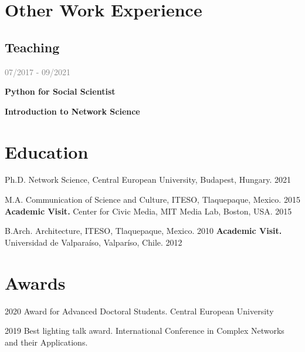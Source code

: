 \documentclass{academiccv}
\begin{document}
\section*{Other Work Experience}
\subsection*{Teaching}
\textcolor{gray}{{\small 07/2017 - 09/2021}}\\
\begin{list}{}{}
  \item{\textbf{Python for Social Scientist}}
  \item{\textbf{Introduction to Network Science}}
\end{list}
\vspace{0.5em}


\section*{Education}
\begin{tablist}
	\item[Ph.D.] \tab Network Science, Central European University, Budapest, Hungary. 2021 
	\item[M.A.]  \tab Communication of Science and Culture, ITESO, Tlaquepaque, Mexico. 2015 \\
		\subitem\textbf{Academic Visit.} Center for Civic Media, MIT Media Lab, Boston, USA. 2015
	\item[B.Arch.]  \tab Architecture,  ITESO, Tlaquepaque, Mexico. 2010
		\subitem\textbf{Academic Visit.} Universidad de Valparaíso, Valparíso, Chile. 2012 
\end{tablist}


\section*{Awards}
\begin{tablist}
	\item[2020] \tab Award for Advanced Doctoral Students. Central European University 
	\item[2019] \tab Best lighting talk award. International Conference in Complex Networks and their Applications. 
\end{tablist}
\end{document}
